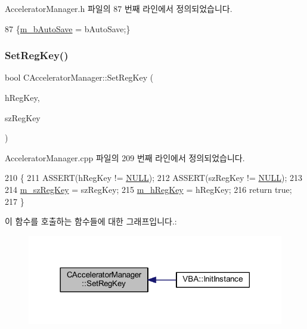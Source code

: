 Accelerator\+Manager.\+h 파일의 87 번째 라인에서 정의되었습니다.


\begin{DoxyCode}
87 \{\mbox{\hyperlink{class_c_accelerator_manager_a37b504c74c13ca2d62eea8abffe73102}{m\_bAutoSave}} = bAutoSave;\}
\end{DoxyCode}
\mbox{\label{class_c_accelerator_manager_a6ea67e9b2bfbda2f0305024e0d73a5bb}} 
\subsubsection{\texorpdfstring{Set\+Reg\+Key()}{SetRegKey()}}
{\footnotesize\ttfamily bool C\+Accelerator\+Manager\+::\+Set\+Reg\+Key (\begin{DoxyParamCaption}\item[{H\+K\+EY}]{h\+Reg\+Key,  }\item[{L\+P\+C\+T\+S\+TR}]{sz\+Reg\+Key }\end{DoxyParamCaption})}



Accelerator\+Manager.\+cpp 파일의 209 번째 라인에서 정의되었습니다.


\begin{DoxyCode}
210 \{
211   ASSERT(hRegKey != \mbox{\hyperlink{getopt1_8c_a070d2ce7b6bb7e5c05602aa8c308d0c4}{NULL}});
212   ASSERT(szRegKey != \mbox{\hyperlink{getopt1_8c_a070d2ce7b6bb7e5c05602aa8c308d0c4}{NULL}});
213 
214   \mbox{\hyperlink{class_c_accelerator_manager_a03a6d0e43bcfb63cf1a23ad12cb5aa35}{m\_szRegKey}} = szRegKey;
215   \mbox{\hyperlink{class_c_accelerator_manager_a2652d64c947f7f3474b3aa054861b34b}{m\_hRegKey}} = hRegKey;
216   \textcolor{keywordflow}{return} \textcolor{keyword}{true};
217 \}
\end{DoxyCode}
이 함수를 호출하는 함수들에 대한 그래프입니다.\+:
\nopagebreak
\begin{figure}[H]
\begin{center}
\leavevmode
\includegraphics[width=318pt]{class_c_accelerator_manager_a6ea67e9b2bfbda2f0305024e0d73a5bb_icgraph}
\end{center}
\end{figure}
\mbox{\label{class_c_accelerator_manager_ac7411d20f413ea0ec3bd65705b564adf}} 
